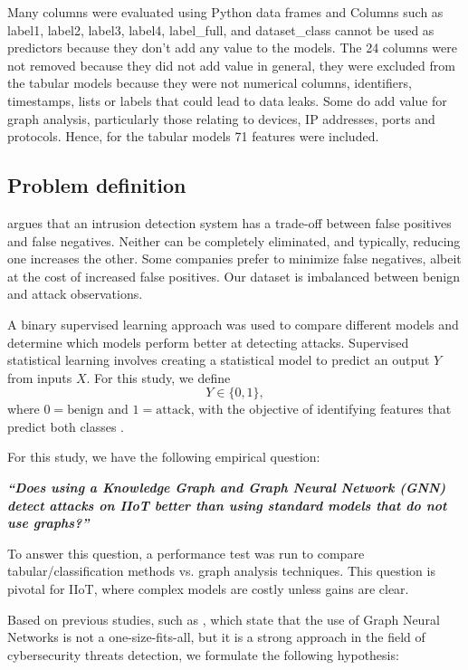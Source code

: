 \documentclass[final,5p,times,twocolumn]{elsarticle}
\begin{document}
Many columns were evaluated using Python data frames and Columns such as label1, label2, label3, label4, label\_full, and dataset\_class cannot be used as predictors because they don’t add any value to the models. The 24 columns were not removed because they did not add value in general, they were excluded from the tabular models because they were not numerical columns, identifiers, timestamps, lists or labels that could lead to data leaks. Some do add value for graph analysis, particularly those relating to devices, IP addresses, ports and protocols. Hence, for the tabular models 71 features were included.






\subsection{Problem definition}
\label{problem-definition}
 \cite{scarfone2007guide} argues that an intrusion detection system has a trade-off between false positives and false negatives. Neither can be completely eliminated, and typically, reducing one increases the other. Some companies prefer to minimize false negatives, albeit at the cost of increased false positives. Our dataset is imbalanced between benign and attack observations.

A binary supervised learning approach was used to compare different models and determine which models perform better at detecting attacks. Supervised statistical learning involves creating a statistical model to predict an output \(Y\) from inputs \(X\). For this study, we define
\[
Y \in \{0,1\},
\]
where \(0 = \text{benign}\) and \(1 = \text{attack}\), with the objective of identifying features that predict both classes \citep{alma990016042380204808}.

For this study, we have the following empirical question:



\begin{center}
\textit{\textbf{``Does using a Knowledge Graph and Graph Neural Network (GNN) detect attacks on IIoT better than using standard models that do not use graphs?''}}
\end{center}

To answer this question, a performance test was run to compare tabular/classification methods vs. graph analysis techniques. This question is pivotal for IIoT, where complex models are costly unless gains are clear.

Based on previous studies, such as \citep{hwang2026cgllm,bilot2023graph,gokstorp_machine_2026,altaf_gnn-based_2024}, which state that the use of Graph Neural Networks is not a one-size-fits-all, but it is a strong approach in the field of cybersecurity threats detection, we formulate the following hypothesis:
\end{document}
